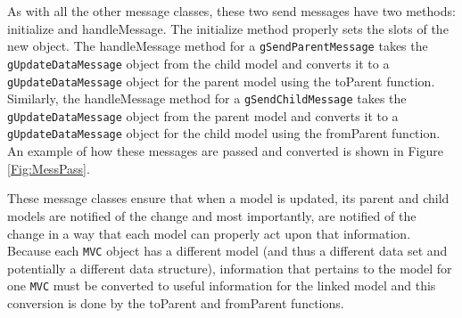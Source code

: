\documentclass{article}[11pt]
\newcommand{\Rfunction}[1]{{\textsf{#1}}}
\newcommand{\Robject}[1]{{\texttt{#1}}}
\begin{document}
As with all the other message classes, these two send messages have
two methods: \Rfunction{initialize} and \Rfunction{handleMessage}.  The
\Rfunction{initialize} method properly sets the slots of the new object.  The
\Rfunction{handleMessage} method for a \Robject{gSendParentMessage}
takes the \Robject{gUpdateDataMessage} object from the child model
and converts it to a \Robject{gUpdateDataMessage} object for the parent
model using the \Rfunction{toParent} function.  Similarly, the
\Rfunction{handleMessage} method for a \Robject{gSendChildMessage} takes the
\Robject{gUpdateDataMessage} object from the parent model and
converts it to a \Robject{gUpdateDataMessage} object for the child
model using the \Rfunction{fromParent} function.  An example of how
these messages are passed and converted is shown in Figure \ref{Fig:MessPass}.

These message classes ensure that when a model is updated, its parent and
child models are notified of the change and most importantly, are
notified of the change in a way that each model can properly act upon that
information.  Because each \Robject{MVC} object has a different model (and
thus a different data set and potentially a different data structure),
information that pertains to the model for one \Robject{MVC} must be converted
to useful information for the linked model and this conversion is done by the
\Rfunction{toParent} and \Rfunction{fromParent} functions.  
\end{document}
